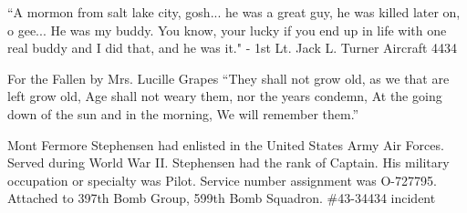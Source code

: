 \documentclass{article}
\begin{document}
\begin{multicols}{3}
\closearticle




``A mormon from salt lake city, gosh... he was a great guy, 
he was killed later on, o gee... He was my buddy. You know, 
your lucky if you end up in life with one real buddy and I 
did that, and he was it." - 1st Lt. Jack L. Turner
Aircraft 4434


For the Fallen by Mrs. Lucille Grapes
``They shall not grow old, as we that are left grow old,
Age shall not weary them, nor the years condemn,
At the going down of the sun and in the morning,
We will remember them.''

%
%



% 

% 
% 

\begin{window} Mont Fermore Stephensen had enlisted in the United States Army Air Forces. Served during World War II. Stephensen had the rank of Captain. His military occupation or specialty was Pilot. Service number assignment was O-727795. Attached to 397th Bomb Group, 599th Bomb Squadron. \#43-34434 incident
%
\end{window}


\end{multicols}
\end{document}
